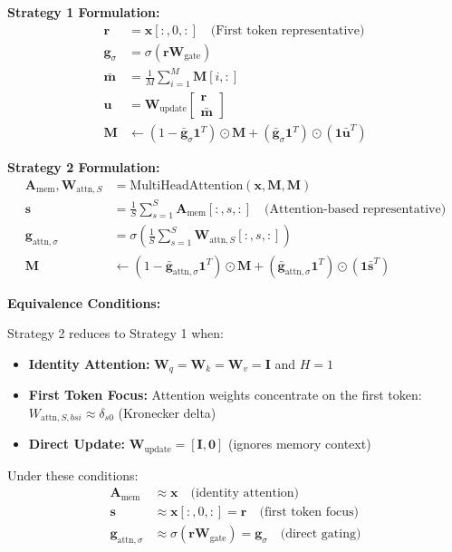 \documentclass{article}
\begin{document}
\textbf{Strategy 1 Formulation:}
\begin{align}
\mathbf{r} &= \mathbf{x}[:, 0, :] \quad \text{(First token representative)} \\
\mathbf{g}_\sigma &= \sigma(\mathbf{r} \mathbf{W}_{\text{gate}}) \\
\bar{\mathbf{m}} &= \frac{1}{M}\sum_{i=1}^{M} \mathbf{M}[i, :] \\
\mathbf{u} &= \mathbf{W}_{\text{update}} \begin{bmatrix} \mathbf{r} \\ \bar{\mathbf{m}} \end{bmatrix} \\
\mathbf{M} &\leftarrow (1 - \bar{\mathbf{g}}_\sigma \mathbf{1}^T) \odot \mathbf{M} + (\bar{\mathbf{g}}_\sigma \mathbf{1}^T) \odot (\mathbf{1} \bar{\mathbf{u}}^T)
\end{align}

\textbf{Strategy 2 Formulation:}
\begin{align}
\mathbf{A}_{\text{mem}}, \mathbf{W}_{\text{attn},S} &= \text{MultiHeadAttention}(\mathbf{x}, \mathbf{M}, \mathbf{M}) \\
\mathbf{s} &= \frac{1}{S}\sum_{s=1}^{S} \mathbf{A}_{\text{mem}}[:, s, :] \quad \text{(Attention-based representative)} \\
\mathbf{g}_{\text{attn},\sigma} &= \sigma\left(\frac{1}{S}\sum_{s=1}^{S} \mathbf{W}_{\text{attn},S}[:, s, :]\right) \\
\mathbf{M} &\leftarrow (1 - \bar{\mathbf{g}}_{\text{attn},\sigma} \mathbf{1}^T) \odot \mathbf{M} + (\bar{\mathbf{g}}_{\text{attn},\sigma} \mathbf{1}^T) \odot (\mathbf{1} \bar{\mathbf{s}}^T)
\end{align}

\textbf{Equivalence Conditions:}

Strategy 2 reduces to Strategy 1 when:
\begin{itemize}
\item \textbf{Identity Attention:} $\mathbf{W}_q = \mathbf{W}_k = \mathbf{W}_v = \mathbf{I}$ and $H = 1$
\item \textbf{First Token Focus:} Attention weights concentrate on the first token: $W_{\text{attn},S,bsi} \approx \delta_{s0}$ (Kronecker delta)
\item \textbf{Direct Update:} $\mathbf{W}_{\text{update}} = [\mathbf{I}, \mathbf{0}]$ (ignores memory context)
\end{itemize}

Under these conditions:
\begin{align}
\mathbf{A}_{\text{mem}} &\approx \mathbf{x} \quad \text{(identity attention)} \\
\mathbf{s} &\approx \mathbf{x}[:, 0, :] = \mathbf{r} \quad \text{(first token focus)} \\
\mathbf{g}_{\text{attn},\sigma} &\approx \sigma(\mathbf{r} \mathbf{W}_{\text{gate}}) = \mathbf{g}_\sigma \quad \text{(direct gating)}
\end{align}
\end{document}
